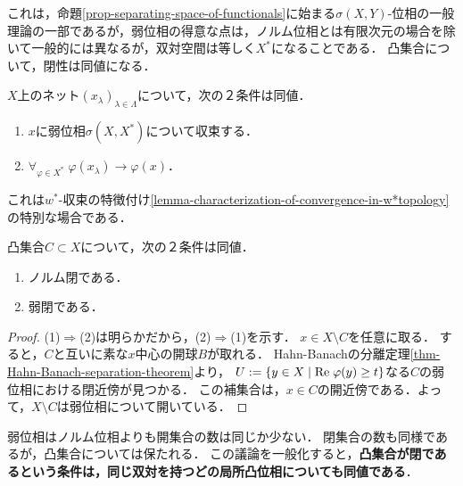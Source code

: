 \documentclass[uplatex,dvipdfmx]{jsreport}
\begin{document}
\begin{tcolorbox}[colframe=ForestGreen, colback=ForestGreen!10!white,breakable,colbacktitle=ForestGreen!40!white,coltitle=black,fonttitle=\bfseries\sffamily,
    title=]
    これは，命題\ref{prop-separating-space-of-functionals}に始まる$\sigma(X,Y)$-位相の一般理論の一部であるが，弱位相の得意な点は，ノルム位相とは有限次元の場合を除いて一般的には異なるが，双対空間は等しく$X^*$になることである．
    凸集合について，閉性は同値になる．
\end{tcolorbox}

\begin{proposition}[弱収束は各点収束]\label{prop-characterization-of-convergence-in-wtopology}
    $X$上のネット$(x_\lambda)_{\lambda\in\Lambda}$について，次の２条件は同値．
    \begin{enumerate}
        \item $x$に弱位相$\sigma(X,X^*)$について収束する．
        \item $\forall_{\varphi\in X^*}\;\varphi(x_\lambda)\to\varphi(x)$．
    \end{enumerate}
\end{proposition}
\begin{remarks}
    これは$w^*$-収束の特徴付け\ref{lemma-characterization-of-convergence-in-w*topology}の特別な場合である．
\end{remarks}

\begin{proposition}\label{prop-closedness-of-convex-sets}
    凸集合$C\subset X$について，次の２条件は同値．
    \begin{enumerate}
        \item ノルム閉である．
        \item 弱閉である．
    \end{enumerate}
\end{proposition}
\begin{proof}
    (1)$\Rightarrow$(2)は明らかだから，(2)$\Rightarrow$(1)を示す．
    $x\in X\setminus C$を任意に取る．
    すると，$C$と互いに素な$x$中心の開球$B$が取れる．
    Hahn-Banachの分離定理\ref{thm-Hahn-Banach-separation-theorem}より，
    $U:=\left\{y\in X\mid\mathrm{Re}\;\varphi(y)\ge t\right\}$なる$C$の弱位相における閉近傍が見つかる．
    この補集合は，$x\in C$の開近傍である．よって，$X\setminus C$は弱位相について開いている．
\end{proof}
\begin{remarks}
    弱位相はノルム位相よりも開集合の数は同じか少ない．
    閉集合の数も同様であるが，凸集合については保たれる．
    この議論を一般化すると，\textbf{凸集合が閉であるという条件は，同じ双対を持つどの局所凸位相についても同値である}．
\end{remarks}
\end{document}
